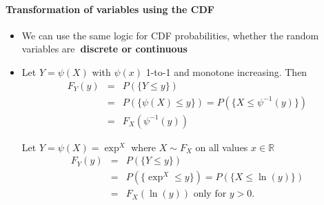 \documentclass[notes=show,smaller,handout]{beamer}\usepackage[]{graphicx}\usepackage[]{color}
\renewcommand{\Pr}{P}
\newenvironment{stepitemize}{\begin{itemize}[<+->]}{\end{itemize} }
\begin{document}
\begin{frame}{\secname}
\framesubtitle{Transformation of variables using the CDF}

  \begin{stepitemize}
  \item We can use the same logic for CDF probabilities, whether the random
  variables are\textbf{\ discrete or continuous}

  \item Let $Y=\psi \left( X\right) $ with $\psi \left( x\right) $ 1-to-1 and
  monotone increasing. Then
  \begin{eqnarray*}
  F_{Y}\left( y\right) &=&\Pr \left( \{ Y\leq y \}\right) \\
  &=&\Pr \left( \{ \psi \left( X\right) \leq y \} \right) =\Pr \left( \{ X\leq \psi
  ^{-1}\left( y\right) \} \right) \\
  &=&F_{X}\left( \psi ^{-1}\left( y\right) \right)
  \end{eqnarray*}

  \begin{example}
  Let $Y=\psi \left( X\right) =\exp^{ X} $ where $%
  X\sim F_X$ on all values $x\in
  \mathbb{R}
  $%
  \begin{eqnarray*}
  F_{Y}\left( y\right) &=&\Pr \left( \{ Y\leq y \} \right) \\
  &=&\Pr \left( \{ \exp^{  X} \leq y \} \right) =\Pr \left( \{ X\leq \ln
  \left( y\right) \} \right) \\
  &=&F_{X}\left( \ln \left( y\right) \right) \text{ only for }y>0\text{.}
  \end{eqnarray*}
  \end{example}

  \end{stepitemize}

\end{frame}%
\end{document}
